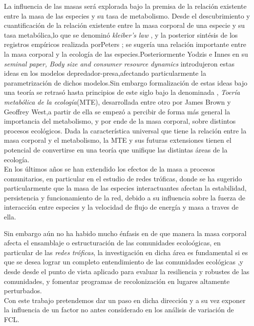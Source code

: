 La influencia de las masas ser\'a explorada bajo la premisa de la relaci\'on existente entre la masa de las especies y su tasa de metabolismo. Desde el descubrimiento y cuantificaci\'on de la relaci\'on existente entre la masa corporal de una especie y su tasa metab\'olica,lo que se denomin\'o \emph{kleiber's law} \citep{kleiber1961fire}, y la posterior sint\'esis de los registros emp\'iricos realizada porPeters \citep{peters1986ecological}; se suger\'ia una relaci\'on importante entre la masa corporal y la ecolog\'ia de las especies.Posteriormente Yodzis e Innes en su \emph{seminal paper, Body size and consumer resource dynamics}\citep{yodzis1992body} introdujeron estas ideas en los modelos depredador-presa,afectando particularmente la parametrizaci\'on de dichos modelos.Sin embargo formalizaci\'on de estas ideas bajo una teor\'ia se retras\'o hasta principios de este siglo bajo la denominada , \emph{Toer\'ia metab\'olica de la ecolog\'ia}(MTE), desarrollada entre otro por James Brown y Geoffrey West\citep{brown2004toward},a partir de ella se empez\'o a percibir de forma m\'as general la importancia del metabolismo, y por ende de la masa corporal, sobre distintos procesos ecol\'ogicos. Dada la caracter\'istica universal que tiene la relaci\'on entre la masa corporal y el metabolismo, la MTE y sus futuras extensiones tienen el potencial de convertirse en una teor\'ia que unifique las distintas \'areas de la ecolog\'ia.\\

En los \'ultimos a\~nos se han extendido los efectos de la masa a procesos comunitarios, en particular en el estudio de redes tr\'oficas, donde se ha sugerido particularmente que la masa de las especies interactuantes afectan la estabilidad, persistencia y funcionamiento de la red, debido a su influencia sobre la fuerza de interacci\'on entre especies y la velocidad de flujo de energ\'ia y masa a traves de ella. \citep{varios, citar luego}

Sin embargo a\'un no ha habido mucho \'enfasis en de que manera la masa corporal afecta el ensamblaje o estructuraci\'on de las comunidades ecolo\'ogicas, en particular de las \emph{redes tr\'oficas}, la investigaci\'on en dicha \'area es fundamental si es que se desea lograr un completo entendimiento de las comunidades ecol\'ogicas ,y desde desde el punto de vista aplicado para evaluar la resiliencia y robustes de las comunidades, y fomentar programas de recolonizaci\'on en lugares altamente perturbados.\\

Con este trabajo pretendemos dar un paso en dicha direcci\'on y a su vez exponer la influencia de un factor no antes considerado en los an\'alisis de variaci\'on de FCL.

